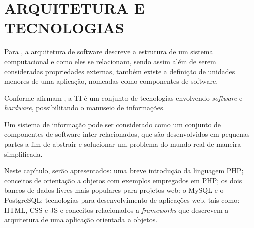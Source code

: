 \chapter{ARQUITETURA E TECNOLOGIAS}
\label{tecnologias}
 
Para , a arquitetura de software descreve a
estrutura de um sistema computacional e como eles se relacionam, sendo assim 
além de serem consideradas propriedades externas, também existe a definição de
unidades menores de uma aplicação, nomeadas como componentes de software.

Conforme afirmam
, a  \ac{TI} é um
conjunto de tecnologias envolvendo \textit{software} e \textit{hardware}, 
possibilitando o manuseio  de informações.

Um sistema de informação pode ser considerado como um conjunto de
componentes de software inter-relacionados, que são desenvolvidos em pequenas 
partes a fim de abstrair e solucionar um problema do mundo real de maneira 
simplificada.
 
Neste capítulo, serão apresentados: uma breve introdução da linguagem \acs{PHP};
conceitos de orientação a objetos com exemplos empregados em \acs{PHP}; os 
dois bancos de dados livres mais populares para projetos web: o
\acs{MySQL} e o \acs{PostgreSQL}; tecnologias para desenvolvimento de aplicações
web, tais como: \acs{HTML}, \acs{CSS} e \acs{JS} e conceitos relacionados a
\textit{frameworks} que descrevem a arquitetura de uma aplicação orientada a
objetos.






